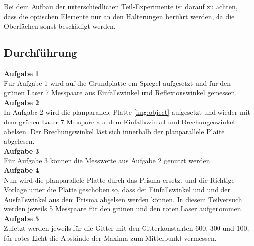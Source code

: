         \noindent
        Bei dem Aufbau der unterschiedlichen Teil-Experimente ist darauf zu achten, dass die optischen Elemente nur an den Halterungen berührt werden, 
        da die Oberfächen sonst beschädigt werden.

    \subsection{Durchführung}

        \textbf{Aufgabe 1}\\

            \noindent
            Für Aufgabe 1 wird auf die Grundplatte ein Spiegel aufgesetzt und für den grünen Laser 7 Messpaare aus Einfallswinkel und Reflexionswinkel
            gemessen.\\

        \textbf{Aufgabe 2}\\
            
            \noindent In Aufgabe 2 wird die planparallele Platte \ref{img:object} aufgesetzt und wieder mit dem grünen Laser 7 Messpare aus dem 
            Einfallswinkel und Brechungeswinkel abelsen. Der Brechungswinkel läst sich innerhalb der planparallele Platte abgelesen.\\
        
        \textbf{Aufgabe 3}\\

            \noindent Für Aufgabe 3 können die Messwerte aus Aufgabe 2 genutzt werden. \\

        \textbf{Aufgabe 4}\\

            \noindent Nun wird die planparallele Platte durch das Prisma ersetzt und die Richtige Vorlage unter die Platte geschoben so, dass der 
            Einfallswinkel und und der Ausfallswinkel aus dem Prisma abgelsen werden können. In diesem Teilversuch werden jeweils 5 Messpaare für den 
            grünen und den roten Laser aufgenommen.\\

        \textbf{Aufgabe 5}\\

            \noindent Zuletzt werden jeweils für die Gitter mit den Gitterkonstanten 600, 300 und 100,  für rotes Licht die Abstände der Maxima zum 
            Mittelpunkt vermessen.\\
        
        
